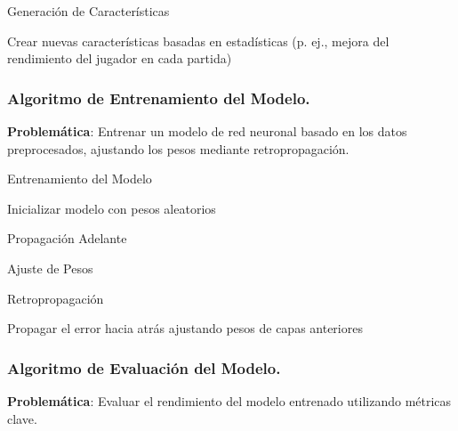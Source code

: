 \begin{algorithm}[H]
\caption{Generación de Características}
\SetAlgoLined
{}
Crear nuevas características basadas en estadísticas (p. ej., mejora del rendimiento del jugador en cada partida)\;
\end{algorithm}

\subsubsection*{Algoritmo de Entrenamiento del Modelo.}
\textbf{Problemática}: Entrenar un modelo de red neuronal basado en los datos preprocesados, ajustando los pesos mediante retropropagación.

\begin{algorithm}[H]
\caption{Entrenamiento del Modelo}
\SetAlgoLined
{}
Inicializar modelo con pesos aleatorios\;
\end{algorithm}

\begin{algorithm}[H]
\caption{Propagación Adelante}
\SetAlgoLined
{}
\end{algorithm}

\begin{algorithm}[H]
\caption{Ajuste de Pesos}
\SetAlgoLined
{}
\end{algorithm}

\begin{algorithm}[H]
\caption{Retropropagación}
\SetAlgoLined
{}
Propagar el error hacia atrás ajustando pesos de capas anteriores\;
\end{algorithm}

\subsubsection*{Algoritmo de Evaluación del Modelo.}
\textbf{Problemática}: Evaluar el rendimiento del modelo entrenado utilizando métricas clave.

